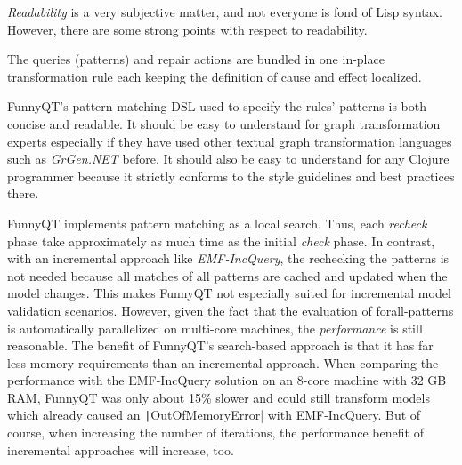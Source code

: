 \documentclass[submission]{eptcs}
\begin{document}
\emph{Readability} is a very subjective matter, and not everyone is fond of
Lisp syntax.  However, there are some strong points with respect to
readability.
\begin{inparaenum}[(1)]
\item The queries (patterns) and repair actions are bundled in one in-place
  transformation rule each keeping the definition of cause and effect
  localized.
\item FunnyQT's pattern matching DSL used to specify the rules' patterns is
  both concise and readable.  It should be easy to understand for graph
  transformation experts especially if they have used other textual graph
  transformation languages such as \emph{GrGen.NET} before.  It should also be
  easy to understand for any Clojure programmer because it strictly conforms to
  the style guidelines and best practices there.
\end{inparaenum}

FunnyQT implements pattern matching as a local search.  Thus, each
\emph{recheck} phase take approximately as much time as the initial
\emph{check} phase.  In contrast, with an incremental approach like
\emph{EMF-IncQuery}, the rechecking the patterns is not needed because all
matches of all patterns are cached and updated when the model changes.  This
makes FunnyQT not especially suited for incremental model validation scenarios.
However, given the fact that the evaluation of forall-patterns is automatically
parallelized on multi-core machines, the \emph{performance} is still
reasonable.  The benefit of FunnyQT's search-based approach is that it has far
less memory requirements than an incremental approach.  When comparing the
performance with the EMF-IncQuery solution on an 8-core machine with 32 GB RAM,
FunnyQT was only about 15\% slower and could still transform models which
already caused an \texttt|OutOfMemoryError| with EMF-IncQuery.  But
of course, when increasing the number of iterations, the performance benefit of
incremental approaches will increase, too.




\end{document}
